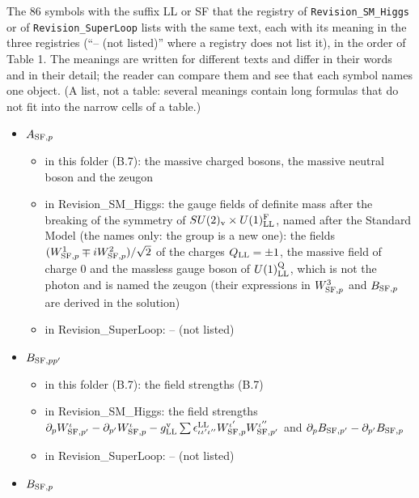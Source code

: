 \documentclass[
  10pt,
]{article}
\providecommand{\tightlist}{%
  \setlength{\itemsep}{0pt}\setlength{\parskip}{0pt}}
\begin{document}
The 86 symbols with the suffix LL or SF that the registry of
\texttt{Revision\_SM\_Higgs} or of \texttt{Revision\_SuperLoop} lists
with the same text, each with its meaning in the three registries (``--
(not listed)'' where a registry does not list it), in the order of Table
1. The meanings are written for different texts and differ in their
words and in their detail; the reader can compare them and see that each
symbol names one object. (A list, not a table: several meanings contain
long formulas that do not fit into the narrow cells of a table.)

\begin{itemize}
\tightlist
\item
  \(A_{{\rm SF},p}\)

  \begin{itemize}
  \tightlist
  \item
    in this folder (B.7): the massive charged bosons, the massive
    neutral boson and the zeugon
  \item
    in Revision\_SM\_Higgs: the gauge fields of definite mass after the
    breaking of the symmetry of
    \(SU(2)_{\rm v}\times U(1)^{\rm F}_{\rm LL}\), named after the
    Standard Model (the names only: the group is a new one): the fields
    \((W^1_{{\rm SF},p}\mp iW^2_{{\rm SF},p})/\sqrt2\) of the charges
    \(Q_{\rm LL}=\pm1\), the massive field of charge 0 and the massless
    gauge boson of \(U(1)^{\rm Q}_{\rm LL}\), which is not the photon
    and is named the zeugon (their expressions in \(W^3_{{\rm SF},p}\)
    and \(B_{{\rm SF},p}\) are derived in the solution)
  \item
    in Revision\_SuperLoop: -- (not listed)
  \end{itemize}
\item
  \(B_{{\rm SF},pp'}\)

  \begin{itemize}
  \tightlist
  \item
    in this folder (B.7): the field strengths (B.7)
  \item
    in Revision\_SM\_Higgs: the field strengths
    \(\partial_pW^\iota_{{\rm SF},p'}-\partial_{p'}W^\iota_{{\rm SF},p}-g^{\rm v}_{\rm LL}\sum\epsilon^{\rm LL}_{\iota\iota'\iota''}W^{\iota'}_{{\rm SF},p}W^{\iota''}_{{\rm SF},p'}\)
    and \(\partial_pB_{{\rm SF},p'}-\partial_{p'}B_{{\rm SF},p}\)
  \item
    in Revision\_SuperLoop: -- (not listed)
  \end{itemize}
\item
  \(B_{{\rm SF},p}\)


\end{itemize}
\end{document}
